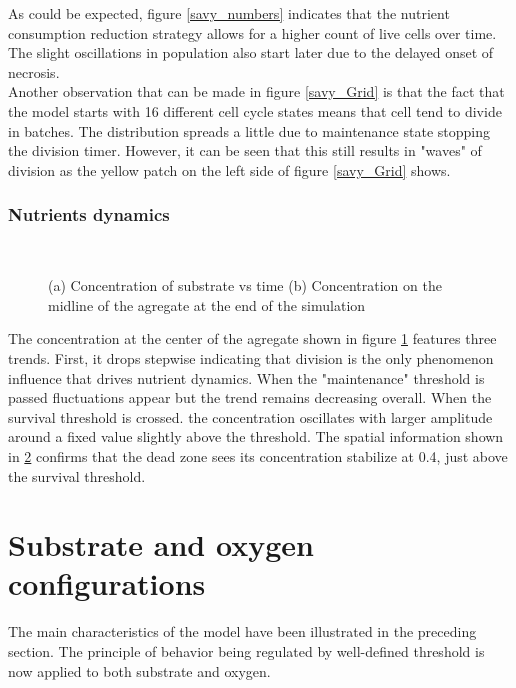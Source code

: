 \documentclass[11pt,a4paper]{article}
\begin{document}
As could be expected, figure \ref{savy_numbers} indicates  that the nutrient consumption reduction strategy allows for a higher count of live cells over time. The slight oscillations in population also start later due to the delayed onset of necrosis.\\

Another observation that can be made in figure \ref{savy_Grid} is that the fact that the model starts with 16 different cell cycle states means that cell tend to divide in batches. The distribution spreads a little due to maintenance state stopping the division timer. However, it can be seen that this still results in "waves" of division as the yellow patch on the left side of figure \ref{savy_Grid} shows.\\

\subsubsection{Nutrients dynamics}
\begin{figure}[h]
\begin{subfigure}{0.5\textwidth}
	\centering
	
	\caption{ \label{savy_S_center}}
\end{subfigure}
~~
\begin{subfigure}{0.5\textwidth}
	\centering
	
	\caption{\label{S_savy_midline}}
\end{subfigure}
\caption{(a) Concentration of substrate vs time (b) Concentration on the midline of the agregate at the end of the simulation \label{savy_nutr}}
\end{figure}

The concentration at the center of the agregate shown in figure \ref{savy_S_center} features three trends. First, it drops stepwise indicating that division is the only phenomenon influence that drives nutrient dynamics. When the "maintenance" threshold is passed fluctuations appear but the trend remains decreasing overall. When the survival threshold is crossed. the concentration oscillates with larger amplitude around a fixed value slightly above the threshold. The spatial information shown in \ref{S_savy_midline} confirms that the dead zone sees its concentration stabilize at 0.4, just above the survival threshold.\\



\newpage
\section{Substrate and oxygen configurations}
The main characteristics of the model have been illustrated in the preceding section. The principle of behavior being regulated by well-defined threshold is now applied to both substrate and oxygen.\\
\end{document}
